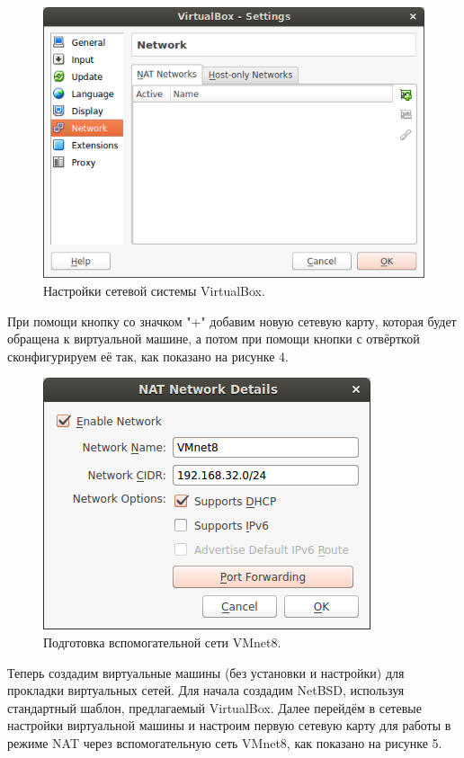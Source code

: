 \documentclass[a4paper, 12pt]{article}		%
\begin{document}
\begin{figure}[h!]
\centering
\includegraphics[scale=0.8]{res/virtualbox-networks}
\caption{Настройки сетевой системы VirtualBox.}
\end{figure}

При помощи кнопку со значком "+" добавим новую сетевую карту, которая будет обращена к виртуальной машине, а потом при помощи кнопки с отвёрткой сконфигурируем её так, как показано на рисунке 4.

\begin{figure}[h!]
\centering
\includegraphics[scale=0.8]{res/virtualbox-nat}
\caption{Подготовка вспомогательной сети VMnet8.}
\end{figure}

Теперь создадим виртуальные машины (без установки и настройки) для прокладки виртуальных сетей. Для начала создадим NetBSD, используя стандартный шаблон, предлагаемый VirtualBox. Далее перейдём в сетевые настройки виртуальной машины и настроим первую сетевую карту для работы в режиме NAT через вспомогательную сеть VMnet8, как показано на рисунке 5.
\end{document}
